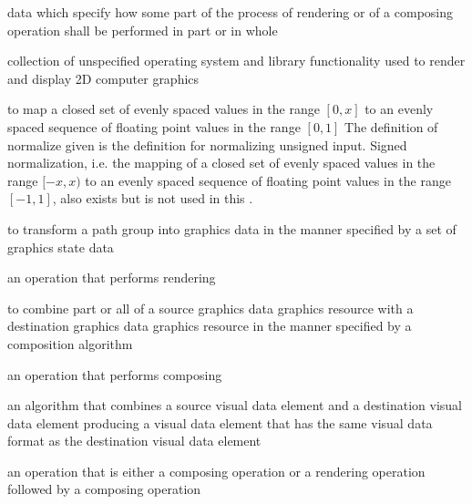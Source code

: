 data which specify how some part of the process of rendering or of a composing operation shall be performed in part or in whole

collection of unspecified operating system and library functionality used to render and display 2D computer graphics

to map a closed set of evenly spaced values in the range $[0, x]$ to an evenly spaced sequence of floating point values in the range $[0, 1]$
\enternote
The definition of normalize given is the definition for normalizing unsigned input. Signed normalization, i.e. the mapping of a closed set of evenly spaced values in the range $[-x, x)$ to an evenly spaced sequence of floating point values in the range $[-1, 1]$, also exists but is not used in this \documenttypename{}.
\exitnote

to transform a path group into graphics data in the manner specified by a set of graphics state data

an operation that performs rendering

to combine part or all of a source graphics data graphics resource with a destination graphics data graphics resource in the manner specified by a composition algorithm

an operation that performs composing

an algorithm that combines a source visual data element and a destination visual data element producing a visual data element that has the same visual data format as the destination visual data element

an operation that is either a composing operation or a rendering operation followed by a composing operation

